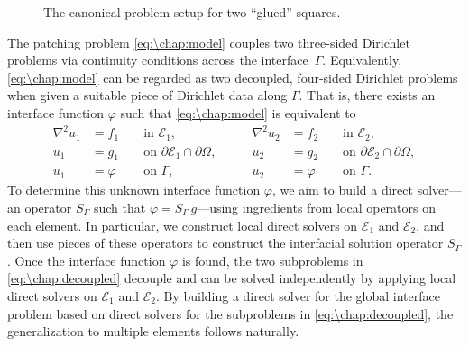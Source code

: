 \begin{figure}[htb]
\begin{center}
\end{center}
\caption{The canonical problem setup for two ``glued'' squares.}
\label{fig:\chap:two_squares}
\end{figure}

The patching problem \cref{eq:\chap:model} couples two three-sided Dirichlet problems via continuity conditions across the interface~$\Gamma$. Equivalently, \cref{eq:\chap:model} can be regarded as two decoupled, four-sided Dirichlet problems when given a suitable piece of Dirichlet data along $\Gamma$. That is, there exists an interface function $\varphi$ such that \cref{eq:\chap:model} is equivalent to
\begin{equation}\label{eq:\chap:decoupled}
\begin{aligned}
\nabla^2 u_1 &= f_1 && \text{ in } \mathcal{E}_1, &\qquad \nabla^2 u_2 &= f_2 && \text{ in } \mathcal{E}_2, \\
u_1 &= g_1 && \text{ on } \partial\mathcal{E}_1 \cap \partial\Omega, &\qquad u_2 &= g_2 && \text{ on } \partial\mathcal{E}_2 \cap \partial\Omega, \\
u_1 &= \varphi && \text{ on } \Gamma, &\qquad u_2 &= \varphi && \text{ on } \Gamma.
\end{aligned}
\end{equation}
To determine this unknown interface function $\varphi$, we aim to build a direct solver---an operator $S_\Gamma$ such that $\varphi = S_\Gamma \, g$---using ingredients from local operators on each element. In particular, we construct local direct solvers on $\mathcal{E}_1$ and $\mathcal{E}_2$, and then use pieces of these operators to construct the interfacial solution operator $S_\Gamma$. Once the interface function $\varphi$ is found, the two subproblems in \cref{eq:\chap:decoupled} decouple and can be solved independently by applying local direct solvers on $\mathcal{E}_1$ and $\mathcal{E}_2$. By building a direct solver for the global interface problem based on direct solvers for the subproblems in \cref{eq:\chap:decoupled}, the generalization to multiple elements follows naturally.

